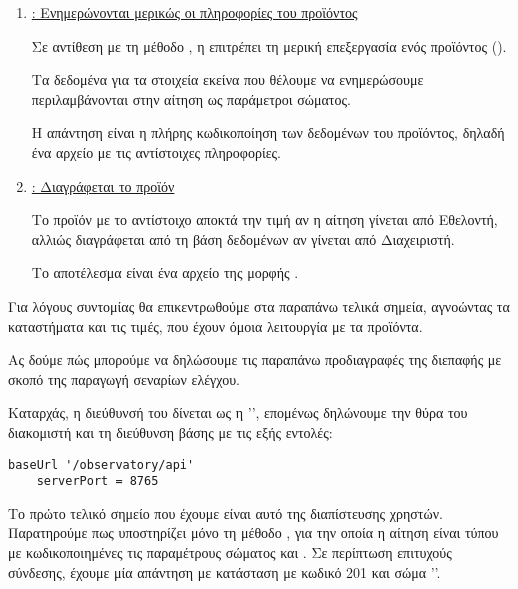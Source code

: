 \begin{itemize}
\begin{enumerate}
        \item \underline{\textbf{}: Ενημερώνονται μερικώς οι πληροφορίες του προϊόντος}
        
        Σε αντίθεση με τη μέθοδο ,
        η  επιτρέπει τη μερική επεξεργασία ενός προϊόντος ().

        Τα δεδομένα για τα στοιχεία εκείνα που θέλουμε να ενημερώσουμε
        περιλαμβάνονται στην αίτηση ως παράμετροι σώματος.

        Η απάντηση είναι η πλήρης κωδικοποίηση των δεδομένων του προϊόντος,
        δηλαδή ένα αρχείο  με τις αντίστοιχες πληροφορίες.

        \item \underline{\textbf{}: Διαγράφεται το προϊόν}
        
        Το προϊόν με το αντίστοιχο  
        αποκτά την τιμή  αν η αίτηση γίνεται από Εθελοντή,
        αλλιώς διαγράφεται από τη βάση δεδομένων αν γίνεται από Διαχειριστή.

        Το αποτέλεσμα είναι ένα αρχείο  της μορφής .
    \end{enumerate}
\end{itemize}
    
    Για λόγους συντομίας θα επικεντρωθούμε στα παραπάνω τελικά σημεία,
    αγνοώντας τα καταστήματα και τις τιμές,
    που έχουν όμοια λειτουργία με τα προϊόντα.

    Ας δούμε πώς μπορούμε να δηλώσουμε τις παραπάνω προδιαγραφές της διεπαφής 
    με σκοπό της παραγωγή σεναρίων ελέγχου.
    
    Καταρχάς, η διεύθυνσή του δίνεται ως η '',
    επομένως δηλώνουμε την θύρα του διακομιστή και τη διεύθυνση βάσης με τις εξής εντολές:

    \begin{lstlisting}[deletekeywords={api}]
    baseUrl '/observatory/api'
    serverPort = 8765
    \end{lstlisting}

    Το πρώτο τελικό σημείο που έχουμε είναι αυτό της διαπίστευσης χρηστών.
    Παρατηρούμε πως υποστηρίζει μόνο τη μέθοδο ,
    για την οποία η αίτηση είναι τύπου 
    με κωδικοποιημένες τις παραμέτρους σώματος  και .
    Σε περίπτωση επιτυχούς σύνδεσης,
    έχουμε μία απάντηση με κατάσταση με κωδικό 201 και σώμα ''.

